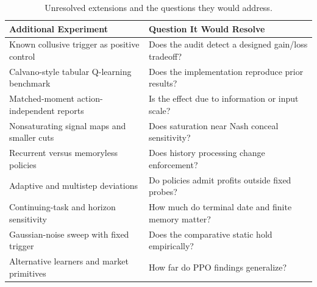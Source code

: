 \begin{table}[t]
\centering
\caption{Unresolved extensions and the questions they would address.}
\label{tab:extensions}
\small
\begin{tabular}{@{}ll@{}}
\toprule
Additional Experiment & Question It Would Resolve \\
\midrule
Known collusive trigger as positive control & Does the audit detect a designed gain/loss tradeoff? \\
Calvano-style tabular Q-learning benchmark & Does the implementation reproduce prior results? \\
Matched-moment action-independent reports & Is the effect due to information or input scale? \\
Nonsaturating signal maps and smaller cuts & Does saturation near Nash conceal sensitivity? \\
Recurrent versus memoryless policies & Does history processing change enforcement? \\
Adaptive and multistep deviations & Do policies admit profits outside fixed probes? \\
Continuing-task and horizon sensitivity & How much do terminal date and finite memory matter? \\
Gaussian-noise sweep with fixed trigger & Does the comparative static hold empirically? \\
Alternative learners and market primitives & How far do PPO findings generalize? \\
\bottomrule
\end{tabular}
\end{table}



